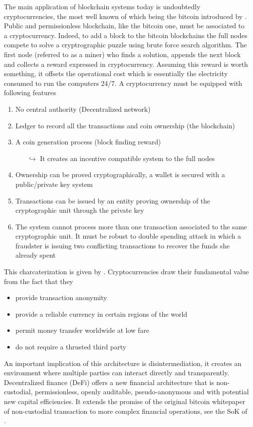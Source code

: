 \noindent The main application of blockchain systems today is undoubtedly cryptocurrencies, the most well known of which being the bitcoin introduced by \citet{Na08}. Public and permissionless blockchain, like the bitcoin one, must be associated to a cryptocurrency. Indeed, to add a block to the bitcoin blockchains the full nodes compete to solve a cryptrographic puzzle using brute force search algorithm. The first node (referred to as a miner) who finds a solution, appends the next block and collects a reward expressed in cryptocurrency. Assuming this reward is worth something, it offsets the operational cost which is essentially the electricity consumed to run the computers 24/7. A cryptocurrency must be equipped with following features
\begin{enumerate}
  \item No central authority (Decentralized network)
  \item Ledger to record all the transactions and coin ownership (the blockchain)
  \item A coin generation process (block finding reward)
    \begin{itemize}
    \item[$\hookrightarrow$] It creates an incentive compatible system to the full nodes 
  \end{itemize}
  \item Ownership can be proved cryptographically, a wallet is secured with a public/private key system 
  \item Transactions can be issued by an entity proving ownership of the cryptographic unit through the private key
  \item The system cannot process more than one transaction associated to the same cryptographic unit. It must be robust to double spending attack in which a fraudster is issuing two conflicting transactions to recover the funds she already spent
\end{enumerate}
This charcaterization is given by \citet{Lansky2018}.
Cryptocurrencies draw their fundamental value from the fact that they 
\begin{itemize}
  \item provide transaction anonymity
  \item provide a reliable currency in certain regions of the world
  \item permit money transfer worldwide at low fare
  \item do not require a thrusted third party
\end{itemize} 
An important implication of this architecture is disintermediation, it creates an environment where
multiple parties can interact directly and transparently. Decentralized finance (DeFi) offers a new financial architecture that is non-custodial, permissionless, openly auditable, pseudo-anonymous and with potential new capital efficiencies. It extends the promise of the original bitcoin whitepaper \citet{Na08} of non-custodial transaction to more complex financial operations, see the SoK of \citet{werner2021sok}.\\

